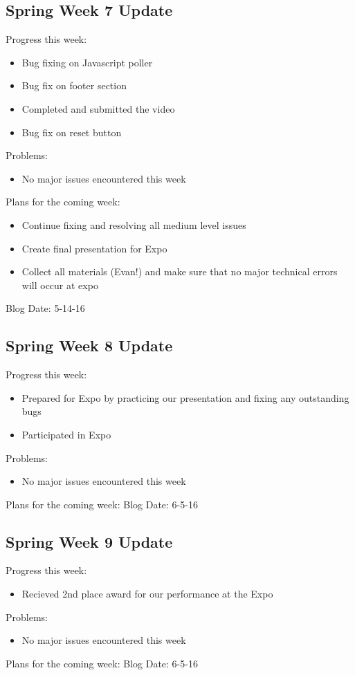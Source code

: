\subsection{Spring Week 7 Update}
Progress this week:
\begin{itemize}
   \item Bug fixing on Javascript poller
   \item Bug fix on footer section
   \item Completed and submitted the video
   \item Bug fix on reset button
\end{itemize}
Problems:
\begin{itemize}
   \item No major issues encountered this week
\end{itemize}
Plans for the coming week:
\begin{itemize}
   \item Continue fixing and resolving all medium level issues
   \item Create final presentation for Expo
   \item Collect all materials (Evan!) and make sure that no major technical errors will occur at expo
\end{itemize}
Blog Date: 5-14-16

\subsection{Spring Week 8 Update}
Progress this week:
\begin{itemize}
   \item Prepared for Expo by practicing our presentation and fixing any outstanding bugs
   \item Participated in Expo
\end{itemize}
Problems:
\begin{itemize}
   \item No major issues encountered this week
\end{itemize}
Plans for the coming week:
Blog Date: 6-5-16

\subsection{Spring Week 9 Update}
Progress this week:
\begin{itemize}
   \item Recieved 2nd place award for our performance at the Expo
\end{itemize}
Problems:
\begin{itemize}
   \item No major issues encountered this week
\end{itemize}
Plans for the coming week:
Blog Date: 6-5-16

